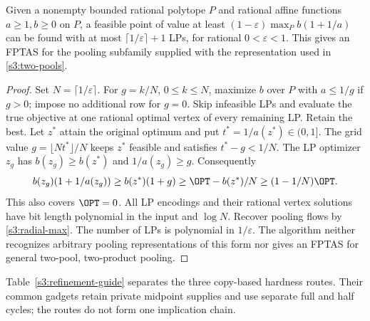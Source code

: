 \begin{proposition}\label{s3:fptas}
Given a nonempty bounded rational polytope $P$ and rational affine
functions $a\ge1,b\ge0$ on $P$, a feasible point of value at least
$(1-\varepsilon)\max_P b(1+1/a)$ can be found with at most
$\lceil1/\varepsilon\rceil+1$ LPs, for rational $0<\varepsilon<1$.
This gives an FPTAS for the pooling subfamily supplied with the
representation used in \cref{s3:two-pools}.
\end{proposition}
\begin{proof}
Set $N=\lceil1/\varepsilon\rceil$. For $g=k/N$, $0\le k\le N$,
maximize $b$ over $P$ with $a\le1/g$ if $g>0$; impose no additional
row for $g=0$. Skip infeasible LPs and evaluate the true objective at
one rational optimal vertex of every remaining LP. Retain the best.
Let $z^*$ attain the original optimum and put $t^*=1/a(z^*)\in(0,1]$.
The grid value $g=\lfloor Nt^*\rfloor/N$ keeps $z^*$ feasible and
satisfies $t^*-g<1/N$. The LP optimizer $z_g$ has $b(z_g)\ge b(z^*)$
and $1/a(z_g)\ge g$. Consequently
\[
 b(z_g)(1+1/a(z_g))\ge b(z^*)(1+g)
 \ge\OPT-b(z^*)/N\ge(1-1/N)\OPT.
\]
This also covers $\OPT=0$. All LP encodings and their rational vertex
solutions have bit length polynomial in the input and $\log N$.
Recover pooling flows by \eqref{s3:radial-max}. The number of LPs is
polynomial in $1/\varepsilon$. The algorithm neither recognizes arbitrary
pooling representations of this form nor gives an FPTAS for general
two-pool, two-product pooling.
\end{proof}

Table~\ref{s3:refinement-guide} separates the three copy-based hardness
routes. Their common gadgets retain private midpoint supplies and use
separate full and half cycles; the routes do not form one implication
chain.

